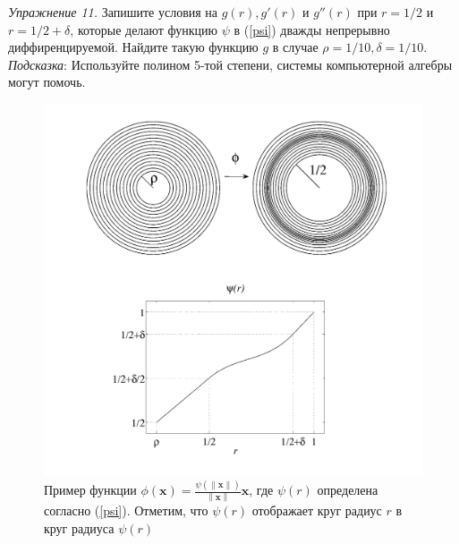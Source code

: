 \documentclass[a4paper, 12pt]{article}
\newcommand{\norm}[1]{\left\lVert#1\right\rVert}
\begin{document}
\textit{Упражнение 11.} Запишите условия на $g(r), g'(r)$ и $g''(r)$ при $r = 1/2$ и
$r =  1/2+ \delta$, которые делают функцию $\psi$ в (\ref{psi}) дважды 
непрерывно диффиренцируемой. Найдите такую функцию $g$ в случае $\rho = 1/10, 
\delta=1/10$. \textit{Подсказка}: Используйте полином 5-той степени, системы 
компьютерной алгебры могут помочь.
\begin{figure}[t]
  \centering
  \includegraphics[height=0.17\paperheight, width=0.35\paperwidth]{4.png}
  \caption{Пример функции $\phi(\textbf{x}) =
  \frac{\psi(\norm{\textbf{x}})}{\norm{\textbf{x}}}\textbf{x}$, где $\psi(r)$
  определена согласно (\ref{psi}). Отметим, что $\psi(r)$ отображает круг радиус
  $r$ в круг радиуса $\psi(r)$}
  \label{fig:4}
\end{figure}
\end{document}
